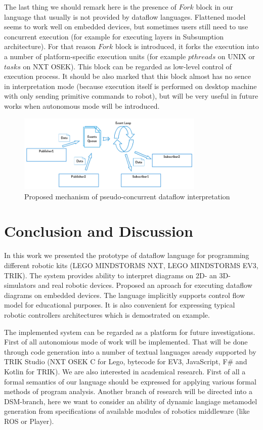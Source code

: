 \documentclass[conference,compsoc]{IEEEtran}
\begin{document}
The last thing we should remark here is the presence of $Fork$ block in our language that usually is not provided by dataflow languages. Flattened model seems to work well on embedded devices, but sometimes users still need to use concurrent execution (for example for executing layers in Subsumption architecture). For that reason $Fork$ block is introduced, it forks the execution into a number of platform-specific execution units (for example $pthreads$ on UNIX or $tasks$ on NXT OSEK). This block can be regarded as low-level control of execution process. It should be also marked that this block almost has no sence in interpretation mode (because execution itself is performed on desktop machine with only sending primitive commands to robot), but will be very useful in future works when autonomous mode will be introduced.

\begin{figure}[ht]
	\centering
	\includegraphics[width=3.5in]{Interaction.png}
	\caption{Proposed mechanism of pseudo-concurrent dataflow interpretation}
	\label{image:interpreter-interaction}
\end{figure}


\section{Conclusion and Discussion}
\label{sec:Conclusion}
In this work we presented the prototype of dataflow language for programming different robotic kits (LEGO MINDSTORMS NXT, LEGO MINDSTORMS EV3, TRIK). The system provides ability to interpret diagrams on 2D- an 3D-simulators and real robotic devices. Proposed an aproach for executing dataflow diagrams on embedded devices. The language implicitly supports control flow model for educational purposes. It is also convenient for expressing typical robotic controllers architectures which is demostrated on example.

The implemented system can be regarded as a platform for future investigations. First of all autonomious mode of work will be implemented. That will be done through code generation into a number of textual languages aready supported by TRIK Studio (NXT OSEK C for Lego, bytecode for EV3, JavaScript, F\#\cite{kirsanov2014robotics} and Kotlin for TRIK). We are also interested in academical research. First of all a formal semantics of our language should be expressed for applying various formal methods of program analysis. Another branch of research will be directed into a DSM-branch, here we want to consider an ability of dynamic langiage metamodel generation from specifications of available modules of robotics middleware (like ROS\cite{quigley2009ros} or Player\cite{gerkey2003player}).

\newpage


\end{document}
